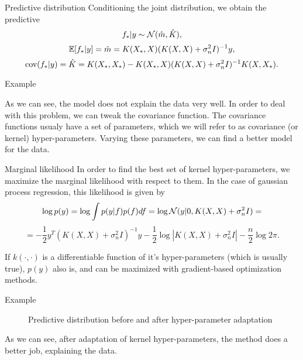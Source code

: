 \begin{frame}{Predictive distribution}
	Conditioning the joint distribution, we obtain the predictive
	$$f_* | y \sim \mathcal{N}( \hat m, \hat K ),$$
	$$\mathbb{E}[f_* | y] = \hat m = K(X_*, X) (K(X, X) + \sigma_n^2 I)^{-1} y,$$
	$$\mbox{cov}(f_* | y ) = \hat K = K(X_*, X_*) - K(X_*, X)(K(X, X) + \sigma_n^2 I)^{-1}K(X, X_*).$$
\end{frame}

\begin{frame}{Example}
	\begin{figure}[!h]
		\centering
		\subfloat{
			\scalebox{0.5}{
				
			}
		}
	\end{figure}

	As we can see, the model does not explain the data very well. In order to deal with this problem, we can tweak the covariance function. The covariance functions usualy have a set of parameters, which we will refer to as covariance (or kernel) hyper-parameters. Varying these parameters, we can find a better model for the data.

\end{frame}

\begin{frame}{Marginal likelihood}
	In order to find the best set of kernel hyper-parameters, we maximize the marginal likelihood with respect to them. In the case of gaussian process regression, this likelihood is given by
	$$\log p(y) = \log \int p(y | f) p(f) df = \log \mathcal{N}(y| 0, K(X, X) + \sigma_n^2 I) = $$
	$$ = -\frac 1 2 y^{T} (K(X, X) + \sigma_n^2 I)^{-1} y - \frac 1 2 \log |K(X, X) + \sigma_n^2 I| - \frac n 2 \log 2 \pi.$$

	If $k(\cdot, \cdot)$ is a differentiable function of it's hyper-parameters (which is usually true), $p(y)$ also is, and can be maximized with gradient-based optimization methods.
\end{frame}

\begin{frame}{Example}

	\begin{figure}[!h]
		\centering
		\subfloat{
			\scalebox{0.5}{
				
			}
		}
		\subfloat{
			\scalebox{0.5}{
				
			}
		}
		\caption{Predictive distribution before and after hyper-parameter adaptation}
	\end{figure}

	As we can see, after adaptation of kernel hyper-parameters, the method does a better job, explaining the data.
\end{frame}

